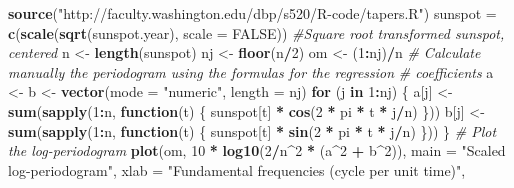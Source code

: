 \documentclass[]{book}
\newenvironment{Shaded}{\begin{snugshade}}{\end{snugshade}}
\newcommand{\KeywordTok}[1]{\textcolor[rgb]{0.13,0.29,0.53}{\textbf{#1}}}
\newcommand{\DataTypeTok}[1]{\textcolor[rgb]{0.13,0.29,0.53}{#1}}
\newcommand{\DecValTok}[1]{\textcolor[rgb]{0.00,0.00,0.81}{#1}}
\newcommand{\StringTok}[1]{\textcolor[rgb]{0.31,0.60,0.02}{#1}}
\newcommand{\CommentTok}[1]{\textcolor[rgb]{0.56,0.35,0.01}{\textit{#1}}}
\newcommand{\OtherTok}[1]{\textcolor[rgb]{0.56,0.35,0.01}{#1}}
\newcommand{\ControlFlowTok}[1]{\textcolor[rgb]{0.13,0.29,0.53}{\textbf{#1}}}
\newcommand{\OperatorTok}[1]{\textcolor[rgb]{0.81,0.36,0.00}{\textbf{#1}}}
\newcommand{\NormalTok}[1]{#1}
\begin{document}
\begin{Shaded}
\begin{Highlighting}[]
\KeywordTok{source}\NormalTok{(}\StringTok{"http://faculty.washington.edu/dbp/s520/R-code/tapers.R"}\NormalTok{)}
\NormalTok{sunspot =}\StringTok{ }\KeywordTok{c}\NormalTok{(}\KeywordTok{scale}\NormalTok{(}\KeywordTok{sqrt}\NormalTok{(sunspot.year), }\DataTypeTok{scale =} \OtherTok{FALSE}\NormalTok{))  }\CommentTok{#Square root transformed sunspot, centered }
\NormalTok{n <-}\StringTok{ }\KeywordTok{length}\NormalTok{(sunspot)}
\NormalTok{nj <-}\StringTok{ }\KeywordTok{floor}\NormalTok{(n}\OperatorTok{/}\DecValTok{2}\NormalTok{)}
\NormalTok{om <-}\StringTok{ }\NormalTok{(}\DecValTok{1}\OperatorTok{:}\NormalTok{nj)}\OperatorTok{/}\NormalTok{n}
\CommentTok{# Calculate manually the periodogram using the formulas for the regression}
\CommentTok{# coefficients}
\NormalTok{a <-}\StringTok{ }\NormalTok{b <-}\StringTok{ }\KeywordTok{vector}\NormalTok{(}\DataTypeTok{mode =} \StringTok{"numeric"}\NormalTok{, }\DataTypeTok{length =}\NormalTok{ nj)}
\ControlFlowTok{for}\NormalTok{ (j }\ControlFlowTok{in} \DecValTok{1}\OperatorTok{:}\NormalTok{nj) \{}
\NormalTok{    a[j] <-}\StringTok{ }\KeywordTok{sum}\NormalTok{(}\KeywordTok{sapply}\NormalTok{(}\DecValTok{1}\OperatorTok{:}\NormalTok{n, }\ControlFlowTok{function}\NormalTok{(t) \{}
\NormalTok{        sunspot[t] }\OperatorTok{*}\StringTok{ }\KeywordTok{cos}\NormalTok{(}\DecValTok{2} \OperatorTok{*}\StringTok{ }\NormalTok{pi }\OperatorTok{*}\StringTok{ }\NormalTok{t }\OperatorTok{*}\StringTok{ }\NormalTok{j}\OperatorTok{/}\NormalTok{n)}
\NormalTok{    \}))}
\NormalTok{    b[j] <-}\StringTok{ }\KeywordTok{sum}\NormalTok{(}\KeywordTok{sapply}\NormalTok{(}\DecValTok{1}\OperatorTok{:}\NormalTok{n, }\ControlFlowTok{function}\NormalTok{(t) \{}
\NormalTok{        sunspot[t] }\OperatorTok{*}\StringTok{ }\KeywordTok{sin}\NormalTok{(}\DecValTok{2} \OperatorTok{*}\StringTok{ }\NormalTok{pi }\OperatorTok{*}\StringTok{ }\NormalTok{t }\OperatorTok{*}\StringTok{ }\NormalTok{j}\OperatorTok{/}\NormalTok{n)}
\NormalTok{    \}))}
\NormalTok{\}}
\CommentTok{# Plot the log-periodogram}
\KeywordTok{plot}\NormalTok{(om, }\DecValTok{10} \OperatorTok{*}\StringTok{ }\KeywordTok{log10}\NormalTok{(}\DecValTok{2}\OperatorTok{/}\NormalTok{n}\OperatorTok{^}\DecValTok{2} \OperatorTok{*}\StringTok{ }\NormalTok{(a}\OperatorTok{^}\DecValTok{2} \OperatorTok{+}\StringTok{ }\NormalTok{b}\OperatorTok{^}\DecValTok{2}\NormalTok{)), }\DataTypeTok{main =} \StringTok{"Scaled log-periodogram"}\NormalTok{, }\DataTypeTok{xlab =} \StringTok{"Fundamental frequencies (cycle per unit time)"}\NormalTok{, }

\end{Highlighting}
\end{Shaded}
\end{document}
